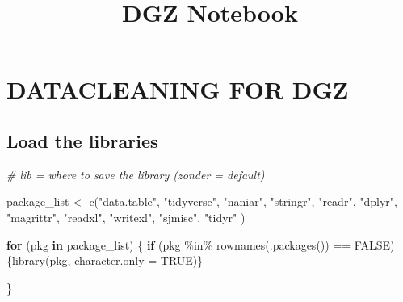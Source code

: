 \documentclass[
]{article}
\title{DGZ Notebook}
\author{}
\date{\vspace{-2.5em}}
\newenvironment{Shaded}{\begin{snugshade}}{\end{snugshade}}
\newcommand{\AttributeTok}[1]{\textcolor[rgb]{0.77,0.63,0.00}{#1}}
\newcommand{\CommentTok}[1]{\textcolor[rgb]{0.56,0.35,0.01}{\textit{#1}}}
\newcommand{\ConstantTok}[1]{\textcolor[rgb]{0.00,0.00,0.00}{#1}}
\newcommand{\ControlFlowTok}[1]{\textcolor[rgb]{0.13,0.29,0.53}{\textbf{#1}}}
\newcommand{\FunctionTok}[1]{\textcolor[rgb]{0.00,0.00,0.00}{#1}}
\newcommand{\NormalTok}[1]{#1}
\newcommand{\OtherTok}[1]{\textcolor[rgb]{0.56,0.35,0.01}{#1}}
\newcommand{\SpecialCharTok}[1]{\textcolor[rgb]{0.00,0.00,0.00}{#1}}
\newcommand{\StringTok}[1]{\textcolor[rgb]{0.31,0.60,0.02}{#1}}
\begin{document}
\maketitle

\hypertarget{datacleaning-for-dgz}{%
\section{DATACLEANING FOR DGZ}\label{datacleaning-for-dgz}}

\hypertarget{load-the-libraries}{%
\subsection{Load the libraries}\label{load-the-libraries}}

\begin{Shaded}
\begin{Highlighting}[]
\CommentTok{\# lib = where to save the library  (zonder = default)}

\NormalTok{package\_list }\OtherTok{\textless{}{-}} \FunctionTok{c}\NormalTok{(}\StringTok{"data.table"}\NormalTok{, }\StringTok{"tidyverse"}\NormalTok{, }\StringTok{"naniar"}\NormalTok{, }\StringTok{"stringr"}\NormalTok{, }\StringTok{"readr"}\NormalTok{,  }\StringTok{"dplyr"}\NormalTok{, }\StringTok{"magrittr"}\NormalTok{, }\StringTok{"readxl"}\NormalTok{, }\StringTok{"writexl"}\NormalTok{, }\StringTok{"sjmisc"}\NormalTok{, }\StringTok{"tidyr"}
\NormalTok{                  )}

\ControlFlowTok{for}\NormalTok{ (pkg }\ControlFlowTok{in}\NormalTok{ package\_list) \{}
  \ControlFlowTok{if}\NormalTok{ (pkg }\SpecialCharTok{\%in\%} \FunctionTok{rownames}\NormalTok{(}\FunctionTok{.packages}\NormalTok{()) }\SpecialCharTok{==} \ConstantTok{FALSE}\NormalTok{)}
\NormalTok{  \{}\FunctionTok{library}\NormalTok{(pkg, }\AttributeTok{character.only =} \ConstantTok{TRUE}\NormalTok{)\}}

\NormalTok{\}}
\end{Highlighting}
\end{Shaded}
\end{document}
